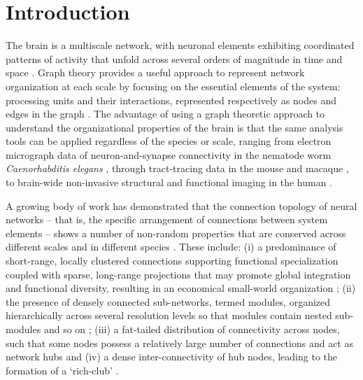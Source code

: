 \section{Introduction}

The brain is a multiscale network, with neuronal elements exhibiting coordinated patterns of activity that unfold across several orders of magnitude in time and space \citep{Buzsaki2004,Lichtman2011,Fornito2016}.
Graph theory provides a useful approach to represent network organization at each scale by focusing on the essential elements of the system: processing units and their interactions, represented respectively as nodes and edges in the graph \citep{Bullmore2009,Fornito2016}.
The advantage of using a graph theoretic approach to understand the organizational properties of the brain is that the same analysis tools can be applied regardless of the species or scale, ranging from electron micrograph data of neuron-and-synapse connectivity in the nematode worm \textit{Caenorhabditis elegans} \citep{White1986,Varshney2011}, through tract-tracing data in the mouse \citep{Oh2014,Gamanut2018} and macaque \citep{Stephan2001,Markov2014}, to brain-wide non-invasive structural and functional imaging in the human \citep{Bassett2009a,Bullmore2009,Fornito2013}.

A growing body of work has demonstrated that the connection topology of neural networks -- that is, the specific arrangement of connections between system elements -- shows a number of non-random properties that are conserved across different scales and in different species \citep{Bullmore2009,Sporns2011,Fornito2016,VandenHeuvel2016,Schroter2017}. These include: (i) a predominance of short-range, locally clustered connections supporting functional specialization coupled with sparse, long-range projections that may promote global integration and functional diversity, resulting in an economical small-world organization \citep{Watts1998,Bassett2017,Betzel2017}; (ii) the presence of densely connected sub-networks, termed modules, organized hierarchically across several resolution levels so that modules contain nested sub-modules and so on \citep{Meunier2009,Bassett2010}; (iii) a fat-tailed distribution of connectivity across nodes, such that some nodes possess a relatively large number of connections and act as network hubs  \citep{VandenHeuvel2011,Towlson2013,VandenHeuvel2016} and (iv) a dense inter-connectivity of hub nodes, leading to the formation of a `rich-club' \citep{Zamora-Lopez2010,VandenHeuvel2011,Harriger2012,Towlson2013}.

